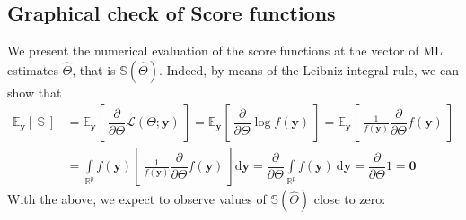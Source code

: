 \documentclass[11pt, a4paper]{article}
\newcommand{\R}{{\ensuremath{\mathbb{R}}}}
\begin{document}
\newpage

\subsection{Graphical check of Score functions}

We present the numerical evaluation of the score functions at the vector of ML estimates $\hat{\Theta}$, that is $\mathbb{S}(\hat{\Theta})$. Indeed, by means of the Leibniz integral rule, we can show that
\begin{align*}
\mathbb{E}_{\mathbf{y}} \left[\!~\mathbb{S}\!~\right] & = \mathbb{E}_{\mathbf{y}} \left[\!~ \dfrac{\partial}{\partial \Theta} \mathcal{L}(\Theta;\mathbf{y}) \!~\right] = \mathbb{E}_{\mathbf{y}} \left[\!~ \dfrac{\partial}{\partial \Theta} \log f(\mathbf{y}) \!~\right] = \mathbb{E}_{\mathbf{y}} \left[\!~  \frac{1}{f(\mathbf{y})} \dfrac{\partial}{\partial \Theta} f(\mathbf{y}) \!~\right] \\
& = \int\limits_{\R^p} f(\mathbf{y}) \left[\!~ \frac{1}{f(\mathbf{y})} \dfrac{\partial}{\partial \Theta} f(\mathbf{y}) \!~\right] \text{d}\mathbf{y} = \dfrac{\partial}{\partial \Theta} \int\limits_{\R^p} f(\mathbf{y})~\text{d}\mathbf{y} = \dfrac{\partial}{\partial \Theta} 1 = \bm{0}
\end{align*}
With the above, we expect to observe values of $\mathbb{S}(\hat{\Theta})$ close to zero:
\end{document}
